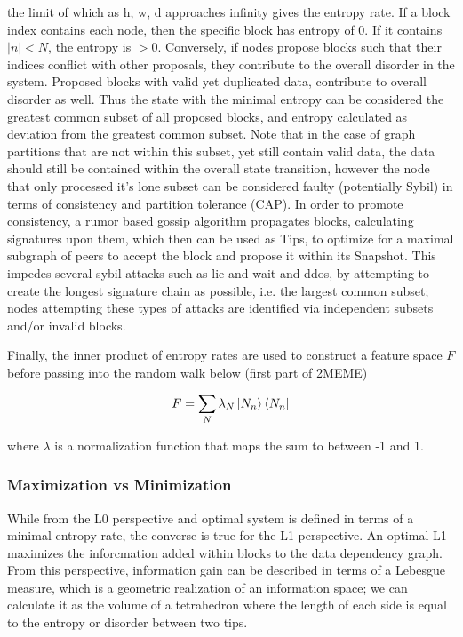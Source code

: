\documentclass{article}
\theoremstyle{definition}
\theoremstyle{remark}
\theoremstyle{plain}
\begin{document}
	the limit of which as h, w, d approaches infinity gives the entropy rate.
If a block index contains each node, then the specific block has entropy of 0. If it contains $|n| < N$, the entropy is $> 0$. Conversely, if nodes propose blocks such that their indices conflict with other proposals, they contribute to the overall disorder in the system. Proposed blocks with valid yet duplicated data, contribute to overall disorder as well. Thus the state with the minimal entropy can be considered the greatest common subset of all proposed blocks, and entropy calculated as deviation from the greatest common subset. Note that in the case of graph partitions that are not within this subset, yet still contain valid data, the data should still be contained within the overall state transition, however the node that only processed it’s lone subset can be considered faulty (potentially Sybil) in terms of consistency and partition tolerance (CAP). In order to promote consistency, a rumor based gossip algorithm propagates blocks, calculating signatures upon them, which then can be used as Tips, to optimize for a maximal subgraph of peers to accept the block and propose it within its Snapshot. This impedes several sybil attacks such as lie and wait and ddos, by attempting to create the longest signature chain as possible, i.e. the largest common subset; nodes attempting these types of attacks are identified via independent subsets and/or invalid blocks.

Finally, the inner product of entropy rates are used to construct a feature space $F$ before passing into the random walk below (first part of 2MEME)

\begin{equation}
F = \sum_N \lambda_N \ket{N_n} \bra{N_n}
\end{equation}

where $\lambda$ is a normalization function that maps the sum to between -1 and 1.

\subsubsection{Maximization vs Minimization}
While from the L0 perspective and optimal system is defined in terms of a minimal entropy rate, the converse is true for the L1 perspective. An optimal L1 maximizes the inforcmation added within blocks to the data dependency graph. From this perspective, information gain can be described in terms of a Lebesgue measure, which is a geometric realization of an information space; we can calculate it as the volume of a tetrahedron where the length of each side is equal to the entropy or disorder between two tips. 
\end{document}

